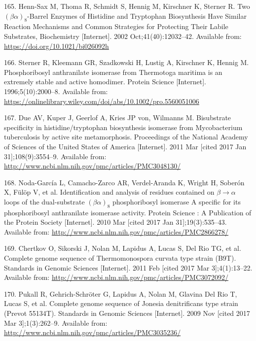 \documentclass[12pt,twoside]{reedthesis}
\begin{document}
  \hypertarget{ref-henn-sax_two_2002}{}
  165. Henn-Sax M, Thoma R, Schmidt S, Hennig M, Kirschner K, Sterner R.
  Two \((\beta\alpha)_8\)-Barrel Enzymes of Histidine and Tryptophan
  Biosynthesis Have Similar Reaction Mechanisms and Common Strategies for
  Protecting Their Labile Substrates, Biochemistry {[}Internet{]}. 2002
  Oct;41(40):12032--42. Available from:
  \url{https://doi.org/10.1021/bi026092h}
  
  \hypertarget{ref-sterner_phosphoribosyl_1996}{}
  166. Sterner R, Kleemann GR, Szadkowski H, Lustig A, Kirschner K, Hennig
  M. Phosphoribosyl anthranilate isomerase from Thermotoga maritima is an
  extremely stable and active homodimer. Protein Science {[}Internet{]}.
  1996;5(10):2000--8. Available from:
  \url{https://onlinelibrary.wiley.com/doi/abs/10.1002/pro.5560051006}
  
  \hypertarget{ref-due_bisubstrate_2011}{}
  167. Due AV, Kuper J, Geerlof A, Kries JP von, Wilmanns M. Bisubstrate
  specificity in histidine/tryptophan biosynthesis isomerase from
  Mycobacterium tuberculosis by active site metamorphosis. Proceedings of
  the National Academy of Sciences of the United States of America
  {[}Internet{]}. 2011 Mar {[}cited 2017 Jan 31{]};108(9):3554--9.
  Available from:
  \url{http://www.ncbi.nlm.nih.gov/pmc/articles/PMC3048130/}
  
  \hypertarget{ref-noda-garcia_identification_2010}{}
  168. Noda-García L, Camacho-Zarco AR, Verdel-Aranda K, Wright H, Soberón
  X, Fülöp V, et al. Identification and analysis of residues contained on
  \(\beta \rightarrow \alpha\) loops of the dual-substrate
  \((\beta\alpha)_8\) phosphoribosyl isomerase A specific for its
  phosphoribosyl anthranilate isomerase activity. Protein Science : A
  Publication of the Protein Society {[}Internet{]}. 2010 Mar {[}cited
  2017 Jan 31{]};19(3):535--43. Available from:
  \url{http://www.ncbi.nlm.nih.gov/pmc/articles/PMC2866278/}
  
  \hypertarget{ref-chertkov_complete_2011}{}
  169. Chertkov O, Sikorski J, Nolan M, Lapidus A, Lucas S, Del Rio TG, et
  al. Complete genome sequence of Thermomonospora curvata type strain
  (B9T). Standards in Genomic Sciences {[}Internet{]}. 2011 Feb {[}cited
  2017 Mar 3{]};4(1):13--22. Available from:
  \url{http://www.ncbi.nlm.nih.gov/pmc/articles/PMC3072092/}
  
  \hypertarget{ref-pukall_complete_2009}{}
  170. Pukall R, Gehrich-Schröter G, Lapidus A, Nolan M, Glavina Del Rio
  T, Lucas S, et al. Complete genome sequence of Jonesia denitrificans
  type strain (Prevot 55134T). Standards in Genomic Sciences
  {[}Internet{]}. 2009 Nov {[}cited 2017 Mar 3{]};1(3):262--9. Available
  from: \url{http://www.ncbi.nlm.nih.gov/pmc/articles/PMC3035236/}
  
\end{document}
